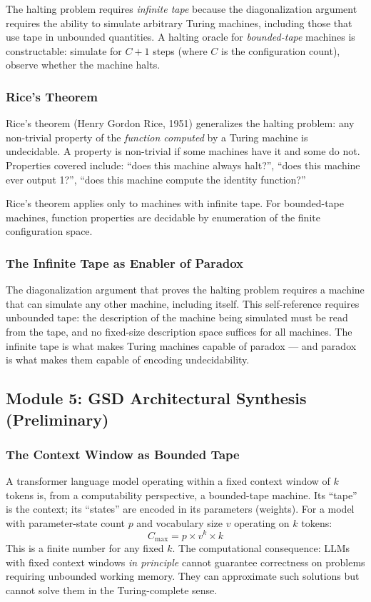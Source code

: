 \documentclass[11pt,letterpaper]{article}
\begin{document}
The halting problem requires \textit{infinite tape} because the diagonalization argument requires the ability to simulate arbitrary Turing machines, including those that use tape in unbounded quantities. A halting oracle for \textit{bounded-tape} machines is constructable: simulate for $C+1$ steps (where $C$ is the configuration count), observe whether the machine halts.

\subsubsection{Rice's Theorem}

Rice's theorem (Henry Gordon Rice, 1951) generalizes the halting problem: any non-trivial property of the \textit{function computed} by a Turing machine is undecidable. A property is non-trivial if some machines have it and some do not. Properties covered include: ``does this machine always halt?'', ``does this machine ever output 1?'', ``does this machine compute the identity function?''

Rice's theorem applies only to machines with infinite tape. For bounded-tape machines, function properties are decidable by enumeration of the finite configuration space.

\subsubsection{The Infinite Tape as Enabler of Paradox}

The diagonalization argument that proves the halting problem requires a machine that can simulate any other machine, including itself. This self-reference requires unbounded tape: the description of the machine being simulated must be read from the tape, and no fixed-size description space suffices for all machines. The infinite tape is what makes Turing machines capable of paradox --- and paradox is what makes them capable of encoding undecidability.

\subsection{Module 5: GSD Architectural Synthesis (Preliminary)}

\subsubsection{The Context Window as Bounded Tape}

A transformer language model operating within a fixed context window of $k$ tokens is, from a computability perspective, a bounded-tape machine. Its ``tape'' is the context; its ``states'' are encoded in its parameters (weights). For a model with parameter-state count $p$ and vocabulary size $v$ operating on $k$ tokens:
\[
C_{\max} = p \times v^k \times k
\]
This is a finite number for any fixed $k$. The computational consequence: LLMs with fixed context windows \textit{in principle} cannot guarantee correctness on problems requiring unbounded working memory. They can approximate such solutions but cannot solve them in the Turing-complete sense.
\end{document}
